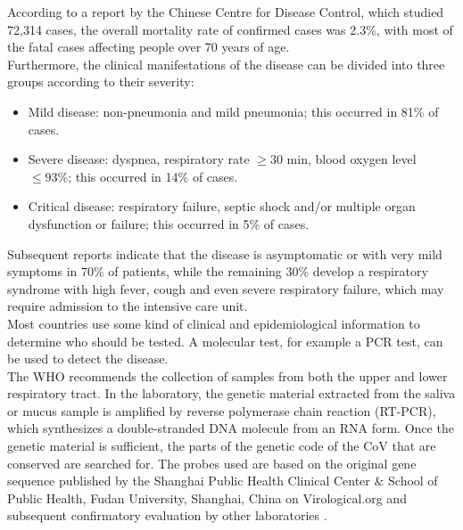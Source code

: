 According to a report by the Chinese Centre for Disease Control, which studied 72,314 cases, the overall mortality rate of confirmed cases was 2.3\%, with most of the fatal cases affecting people over 70 years of age. \\
Furthermore, the clinical manifestations of the disease can be divided into three groups according to their severity:
\begin{itemize}
    \item Mild disease: non-pneumonia and mild pneumonia; this occurred in 81\% of cases.
    \item Severe disease: dyspnea, respiratory rate $\geq 30$ min, blood oxygen level $\leq 93\%$; this occurred in 14\% of cases.
    \item Critical disease: respiratory failure, septic shock and/or multiple organ dysfunction or failure; this occurred in 5\% of cases.
\end{itemize}
Subsequent reports indicate that the disease is asymptomatic or with very mild symptoms in 70\% of patients, while the remaining 30\% develop a respiratory syndrome with high fever, cough and even severe respiratory failure, which may require admission to the intensive care unit. \\
Most countries use some kind of clinical and epidemiological information to determine who should be tested. A molecular test, for example a PCR test, can be used to detect the disease.\\
The WHO recommends the collection of samples from both the upper and lower respiratory tract. In the laboratory, the genetic material extracted from the saliva or mucus sample is amplified by reverse polymerase chain reaction (RT-PCR), which synthesizes a double-stranded DNA molecule from an RNA form. Once the genetic material is sufficient, the parts of the genetic code of the CoV that are conserved are searched for. The probes used are based on the original gene sequence published by the Shanghai Public Health Clinical Center \& School of Public Health, Fudan University, Shanghai, China on Virological.org and subsequent confirmatory evaluation by other laboratories \cite{cascella2021features}.
\clearpage

